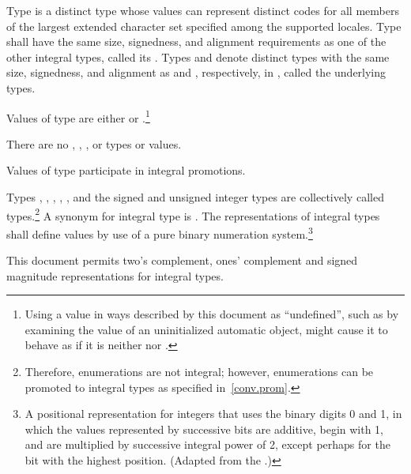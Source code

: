 \pnum
{}%
%
%
%
%
%
%
%
%
Type  is a distinct type whose values can represent
distinct codes for all members of the largest extended character set
specified among the supported locales. Type
 shall have the same size, signedness, and alignment
requirements as one of the other integral types,
called its . Types  and
 denote distinct types with the same size, signedness,
and alignment as  and ,
respectively, in , called the underlying types.

\pnum
{}%
Values of type  are either  or
.\footnote{Using a  value in ways described by this document
as ``undefined'', such as by examining the value of an
uninitialized automatic object, might cause it to behave as if it is
neither  nor .}
\begin{note} There are no , , ,
or  types or values. \end{note} Values of type
 participate in integral promotions.

\pnum
Types , , , ,
, and the signed and unsigned integer types are
collectively called
 types.\footnote{Therefore, enumerations are not integral; however,
enumerations can be promoted to integral types as specified
in~\ref{conv.prom}.}
A synonym for integral type is
%
%
%
. The representations of integral types shall
define values by use of a pure binary numeration system.\footnote{A positional
representation for integers that uses the binary digits 0
and 1, in which the values represented by successive bits are additive,
begin with 1, and are multiplied by successive integral power of 2,
except perhaps for the bit with the highest position. (Adapted from the
.)}
\begin{example} This document permits two's complement,
ones' complement and signed magnitude representations for integral types.
\end{example}

